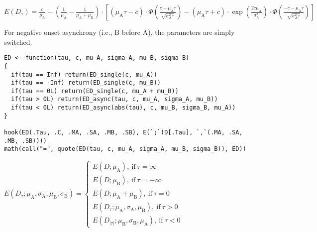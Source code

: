 \({E{\left({D}_{\tau}\right)}}{=}{{\displaystyle{\frac{c}{{\mu}_{\mathrm{A}}}}}{+}{{\left({\displaystyle{\frac{1}{{\mu}_{\mathrm{A}}}}}{-}{\displaystyle{\frac{1}{{{\mu}_{\mathrm{A}}}{+}{{\mu}_{\mathrm{B}}}}}}\right)}{\cdot}{\left[{{\left({{{\mu}_{\mathrm{A}}}{{}}{\tau}}{-}{c}\right)}{\cdot}{\Phi{\left(\displaystyle{\frac{{c}{-}{{{\mu}_{\mathrm{A}}}{{}}{\tau}}}{\sqrt{{{\sigma}_{\mathrm{A}}^{2}}{{}}{\tau}}}}\right)}}}{-}{{{\left({{{\mu}_{\mathrm{A}}}{{}}{\tau}}{+}{c}\right)}{\cdot}{\exp{\left(\displaystyle{\frac{{{2}{{}}{c}}{{}}{{\mu}_{\mathrm{A}}}}{{\sigma}_{\mathrm{A}}^{2}}}\right)}}}{\cdot}{\Phi{\left(\displaystyle{\frac{{{-}{c}}{-}{{{\mu}_{\mathrm{A}}}{{}}{\tau}}}{\sqrt{{{\sigma}_{\mathrm{A}}^{2}}{{}}{\tau}}}}\right)}}}\right]}}}\)

For negative onset asynchrony (i.e., B before A), the parameters are simply
switched.

\begin{verbatim}
ED <- function(tau, c, mu_A, sigma_A, mu_B, sigma_B)
{
  if(tau == Inf) return(ED_single(c, mu_A))
  if(tau == -Inf) return(ED_single(c, mu_B))
  if(tau == 0L) return(ED_single(c, mu_A + mu_B))
  if(tau > 0L) return(ED_async(tau, c, mu_A, sigma_A, mu_B))
  if(tau < 0L) return(ED_async(abs(tau), c, mu_B, sigma_B, mu_A))
}

hook(ED(.Tau, .C, .MA, .SA, .MB, .SB), E(`;`(D[.Tau], `,`(.MA, .SA, .MB, .SB))))
math(call("=", quote(ED(tau, c, mu_A, sigma_A, mu_B, sigma_B)), ED))
\end{verbatim}

\({E{\left({{D}_{\tau}}{;}{{{\mu}_{\mathrm{A}}}{{,}{{\sigma}_{\mathrm{A}}}{{,}{{\mu}_{\mathrm{B}}}{{,}{{\sigma}_{\mathrm{B}}}}}}}\right)}}{=}{\left\{\begin{array}{l}{{E{\left({D}{;}{{\mu}_{\mathrm{A}}}\right)}},\ \mathrm{if}\ {{\tau}{=}{\infty}}}\\ {{E{\left({D}{;}{{\mu}_{\mathrm{B}}}\right)}},\ \mathrm{if}\ {{\tau}{=}{{-}{\infty}}}}\\ {{E{\left({D}{;}{{{\mu}_{\mathrm{A}}}{+}{{\mu}_{\mathrm{B}}}}\right)}},\ \mathrm{if}\ {{\tau}{=}{0}}}\\ {{E{\left({{D}_{\tau}}{;}{{{\mu}_{\mathrm{A}}}{{,}{{\sigma}_{\mathrm{A}}}{{,}{{\mu}_{\mathrm{B}}}}}}\right)}},\ \mathrm{if}\ {{\tau}{>}{0}}}\\ {{E{\left({{D}_{{\left\vert{\tau}\right\vert}}}{;}{{{\mu}_{\mathrm{B}}}{{,}{{\sigma}_{\mathrm{B}}}{{,}{{\mu}_{\mathrm{A}}}}}}\right)}},\ \mathrm{if}\ {{\tau}{<}{0}}}\end{array}\right.}\)

